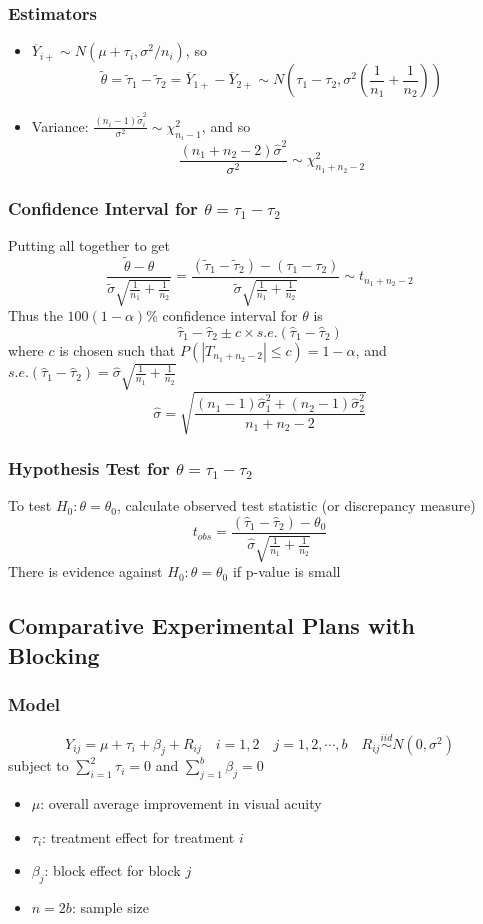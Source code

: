 \documentclass[11pt]{article}
\newcommand{\ds}{\displaystyle}
\begin{document}
\subsubsection*{Estimators}
\begin{itemize}
    \item $\overline{Y}_{i+}\sim N(\mu+\tau_i,\sigma^2/n_i)$, so 
    \[\tilde{\theta}=\tilde{\tau}_1-\tilde{\tau}_2 = \overline{Y}_{1+}-\overline{Y}_{2+}\sim N(\tau_1-\tau_2, \sigma^2(\frac{1}{n_1}+\frac{1}{n_2}))\] 
    \item Variance: $\ds\frac{(n_i-1)\tilde{\sigma}_i^2}{\sigma^2}\sim \chi^2_{n_i-1}$, and so 
    \[\frac{(n_1+n_2-2)\hat{\sigma}^2}{\sigma^2}\sim\chi^2_{n_1+n_2-2}\]
\end{itemize}
\subsubsection*{Confidence Interval for $\theta = \tau_1-\tau_2$}
Putting all together to get 
\[\frac{\tilde{\theta}-\theta}{\tilde{\sigma}\sqrt{\frac{1}{n_1}+\frac{1}{n_2}}} = \frac{(\tilde{\tau}_1-\tilde{\tau}_2)-(\tau_1-\tau_2)}{\tilde{\sigma}\sqrt{\frac{1}{n_1}+\frac{1}{n_2}}} \sim t_{n_1+n_2-2}\]
Thus the $100(1-\alpha)\%$ confidence interval for $\theta$ is
\[\hat\tau_1-\hat\tau_2\pm c\times s.e.(\hat\tau_1-\hat\tau_2)\]
where $c$ is chosen such that $P(|T_{n_1+n_2-2}|\leq c)=1-\alpha$, and $s.e.(\hat\tau_1-\hat\tau_2) = \hat\sigma\sqrt{\frac{1}{n_1}+\frac{1}{n_2}}$
\[\hat\sigma = \sqrt{\frac{(n_1-1)\hat\sigma_1^2+(n_2-1)\hat\sigma_2^2}{n_1+n_2-2}}\]
\subsubsection*{Hypothesis Test for $\theta=\tau_1-\tau_2$}
To test $H_0:\theta=\theta_0$, calculate observed test statistic (or discrepancy measure)
\[t_{obs} = \frac{(\hat\tau_1-\hat\tau_2)-\theta_0}{\hat\sigma\sqrt{\frac{1}{n_1}+\frac{1}{n_2}}}\]
There is evidence against $H_0:\theta=\theta_0$ if p-value is small 
\subsection{Comparative Experimental Plans with Blocking}
\subsubsection{Model}
\[Y_{ij}=\mu+\tau_i+\beta_j+R_{ij}\quad i=1,2\quad j=1,2,\cdots,b\quad R_{ij}\overset{iid}{\sim}N(0,\sigma^2)\]
subject to $\ds\sum_{i=1}^{2}\tau_i=0$ and $\ds\sum_{j=1}^{b}\beta_j=0$
\begin{itemize}
    \item $\mu$: overall average improvement in visual acuity
    \item $\tau_i$: treatment effect for treatment $i$
    \item $\beta_j$: block effect for block $j$
    \item $n=2b$: sample size 
\end{itemize}
\end{document}
